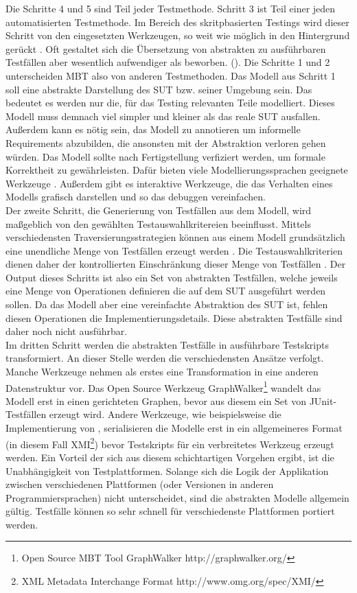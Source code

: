 Die Schritte 4 und 5 sind Teil jeder Testmethode. Schritt 3 ist Teil einer jeden automatisierten Testmethode. Im Bereich des skritpbasierten Testings wird dieser Schritt von den eingesetzten Werkzeugen, so weit wie möglich in den Hintergrund gerückt . Oft gestaltet sich die Übersetzung von abstrakten zu ausführbaren Testfällen aber wesentlich aufwendiger als beworben. ().
Die Schritte 1 und 2 unterscheiden MBT also von anderen Testmethoden. Das Modell aus Schritt 1 soll eine abstrakte Darstellung des SUT bzw. seiner Umgebung sein. Das bedeutet es werden nur die, für das Testing relevanten Teile modelliert. Dieses Modell muss demnach viel simpler und kleiner als das reale SUT ausfallen. Außerdem kann es nötig sein, das Modell zu annotieren um informelle Requirements abzubilden, die ansonsten mit der Abstraktion verloren gehen würden. Das Modell sollte nach Fertigstellung verfiziert werden, um formale Korrektheit zu gewährleisten. Dafür bieten viele Modellierungssprachen geeignete Werkzeuge \cite{kaneiwa_consistency_2006}. Außerdem gibt es interaktive Werkzeuge, die das Verhalten eines Modells grafisch darstellen und so das debuggen vereinfachen.\\
Der zweite Schritt, die Generierung von Testfällen aus dem Modell, wird maßgeblich von den gewählten Testauswahlkritereien beeinflusst. Mittels verschiedensten Traversierungsstrategien können aus einem Modell grundsätzlich eine unendliche Menge von Testfällen erzeugt werden \cite{utting_practical_2007}. Die Testauswahlkriterien dienen daher der kontrollierten Einschränkung dieser Menge von Testfällen . Der Output  dieses Schritts ist also ein Set von abstrakten Testfällen, welche jeweils eine Menge von Operationen definieren die auf dem SUT ausgeführt werden sollen. Da das Modell aber eine vereinfachte Abstraktion des SUT ist, fehlen diesen Operationen die Implementierungsdetails. Diese abstrakten Testfälle sind daher noch nicht ausführbar.\\
Im dritten Schritt werden die abstrakten Testfälle in ausführbare Testskripts transformiert. An dieser Stelle werden die verschiedensten Ansätze verfolgt. Manche Werkzeuge nehmen als erstes eine Transformation in eine anderen Datenstruktur vor. Das Open Source Werkzeug GraphWalker\footnote{Open Source MBT Tool GraphWalker http://graphwalker.org/} wandelt das Modell erst in einen gerichteten Graphen, bevor aus diesem ein Set von JUnit-Testfällen erzeugt wird. Andere Werkzeuge, wie beispielsweise die Implementierung von  \cite{pinheiro_model-based_2013}, serialisieren die Modelle erst in ein allgemeineres Format (in diesem Fall XMI\footnote{XML Metadata Interchange Format http://www.omg.org/spec/XMI/}) bevor Testskripts für ein verbreitetes Werkzeug erzeugt werden. Ein Vorteil der sich aus diesem schichtartigen Vorgehen ergibt, ist die Unabhängigkeit von Testplattformen. Solange sich die Logik der Applikation zwischen verschiedenen Plattformen (oder Versionen in anderen Programmiersprachen) nicht unterscheidet, sind die abstrakten Modelle allgemein gültig. Testfälle können so sehr schnell für verschiedenste Plattformen portiert werden.\\
